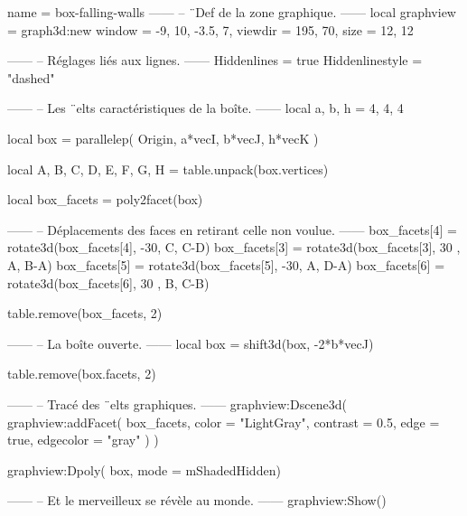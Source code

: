 \documentclass{standalone}
\begin{document}
\begin{luadraw}{name = box-falling-walls}
------
-- ¨Def de la zone graphique.
------
local graphview = graph3d:new{
  window  = {-9, 10, -3.5, 7},
  viewdir = {195, 70},
  size    = {12, 12}
}

------
-- Réglages liés aux lignes.
------
Hiddenlines     = true
Hiddenlinestyle = "dashed"

------
-- Les ¨elts caractéristiques de la boîte.
------
local a, b, h = 4, 4, 4

local box = parallelep(
  Origin,
  a*vecI, b*vecJ, h*vecK
)

local A, B, C, D, E, F, G, H = table.unpack(box.vertices)

local box_facets = poly2facet(box)

------
-- Déplacements des faces en retirant celle non voulue.
------
box_facets[4] = rotate3d(box_facets[4], -30, {C, C-D})
box_facets[3] = rotate3d(box_facets[3], 30 , {A, B-A})
box_facets[5] = rotate3d(box_facets[5], -30, {A, D-A})
box_facets[6] = rotate3d(box_facets[6], 30 , {B, C-B})

table.remove(box_facets, 2)

------
-- La boîte ouverte.
------
local box = shift3d(box, -2*b*vecJ)

table.remove(box.facets, 2)

------
-- Tracé des ¨elts graphiques.
------
graphview:Dscene3d(
  graphview:addFacet(
    box_facets,
    {
      color     = "LightGray",
      contrast  = 0.5,
      edge      = true,
      edgecolor = "gray"
    })
)

graphview:Dpoly(
  box,
  {mode = mShadedHidden})

------
-- Et le merveilleux se révèle au monde.
------
graphview:Show()
\end{luadraw}
\end{document}
